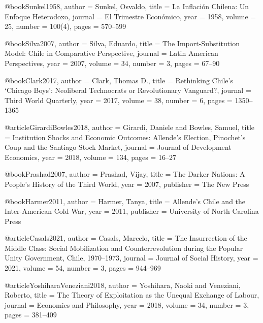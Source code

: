 @book{Sunkel1958,
	author    = {Sunkel, Osvaldo},
	title     = {La Inflaci{\'o}n Chilena: Un Enfoque Heterodoxo},
	journal   = {El Trimestre Econ{\'o}mico},
	year      = {1958},
	volume    = {25},
	number    = {100(4)},
	pages     = {570--599}
}

@book{Silva2007,
	author  = {Silva, Eduardo},
	title   = {The Import-Substitution Model: {Chile} in Comparative Perspective},
	journal = {Latin American Perspectives},
	year    = {2007},
	volume  = {34},
	number  = {3},
	pages   = {67--90}
}

@book{Clark2017,
	author  = {Clark, Thomas D.},
	title   = {Rethinking {Chile}'s `{Chicago Boys}': Neoliberal Technocrats or Revolutionary Vanguard?},
	journal = {Third World Quarterly},
	year    = {2017},
	volume  = {38},
	number  = {6},
	pages   = {1350--1365}
}

@article{GirardiBowles2018,
	author  = {Girardi, Daniele and Bowles, Samuel},
	title   = {Institution Shocks and Economic Outcomes: {Allende}'s Election, {Pinochet}'s Coup and the {Santiago} Stock Market},
	journal = {Journal of Development Economics},
	year    = {2018},
	volume  = {134},
	pages   = {16--27}
}

@book{Prashad2007,
	author    = {Prashad, Vijay},
	title     = {The Darker Nations: A People's History of the Third World},
	year      = {2007},
	publisher = {The New Press}
}

@book{Harmer2011,
	author    = {Harmer, Tanya},
	title     = {Allende's {Chile} and the Inter-{American} Cold War},
	year      = {2011},
	publisher = {University of North Carolina Press}
}

@article{Casals2021,
	author  = {Casals, Marcelo},
	title   = {The Insurrection of the Middle Class: Social Mobilization and Counterrevolution during the {Popular Unity} Government, {Chile}, 1970--1973},
	journal = {Journal of Social History},
	year    = {2021},
	volume  = {54},
	number  = {3},
	pages   = {944--969}
}



@article{YoshiharaVeneziani2018,
	author  = {Yoshihara, Naoki and Veneziani, Roberto},
	title   = {The Theory of Exploitation as the Unequal Exchange of Labour},
	journal = {Economics and Philosophy},
	year    = {2018},
	volume  = {34},
	number  = {3},
	pages   = {381--409}
}

